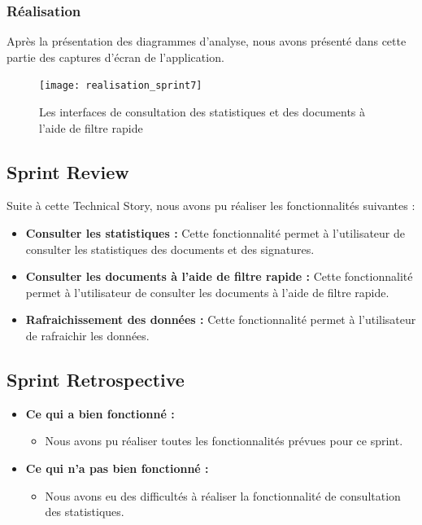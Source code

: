 \subsubsection{Réalisation}

Après la présentation des diagrammes d'analyse, nous avons présenté dans cette partie des captures d'écran de l'application.

\begin{figure}[H]
  \centering
  \texttt{[image: realisation\_sprint7]}
  \caption{Les interfaces de consultation des statistiques et des documents à l'aide de filtre rapide}
  \label{fig:realisation_sprint7}
\end{figure}

\subsection{Sprint Review}
Suite à cette Technical Story, nous avons pu réaliser les fonctionnalités suivantes :
\begin{itemize}
  \item \textbf{Consulter les statistiques :} Cette fonctionnalité permet à l'utilisateur de consulter les statistiques des documents et des signatures.
  \item \textbf{Consulter les documents à l'aide de filtre rapide :} Cette fonctionnalité permet à l'utilisateur de consulter les documents à l'aide de filtre rapide.
  \item \textbf{Rafraichissement des données :} Cette fonctionnalité permet à l'utilisateur de rafraichir les données.
\end{itemize}

\subsection{Sprint Retrospective}

\begin{itemize}
  \item \textbf{Ce qui a bien fonctionné :}
  \begin{itemize}
    \item Nous avons pu réaliser toutes les fonctionnalités prévues pour ce sprint.
  \end{itemize}

    \item \textbf{Ce qui n'a pas bien fonctionné :}
    \begin{itemize}
      \item Nous avons eu des difficultés à réaliser la fonctionnalité de consultation des statistiques.
    \end{itemize}
      
\end{itemize}
